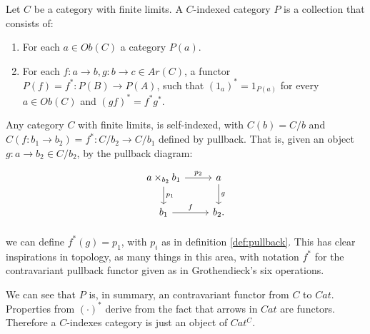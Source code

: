 \begin{definition}
  Let $C$ be a category with finite limits. A $C$-indexed category $P$ is a collection that  consists of:
  \begin{enumerate}
  \item For each $a\in Ob(C)$  a category $P(a)$.
  \item For each $f:a\to b, g:b\to c\in Ar(C)$, a functor $P(f) = f^*:P(B) \to P(A)$, such that $(1_a)^* = 1_{P(a)}$ for every  $a \in Ob(C)$ and $(gf)^*= f^*g^*$.
  \end{enumerate}
\end{definition}
\begin{remark}
  Any category $C$ with finite limits, is self-indexed, with $C(b)=C/b$ and $C(f:b_1\to b_2)=f^*: C/b_2 \to C/b_1$ defined by pullback. That is, given an object $g:a\to b_2 \in C/b_2$, by the pullback diagram:
  \[
    \begin{tikzpicture}
      \node {\begin{tikzcd}
          a \times_{b_2} b_1 \ar[r,"p_2"]\ar[d,"p_1"] & a\ar[d,"g"]\\
          b_1\ar[r,"f"] & b_2.
        \end{tikzcd}};
    \end{tikzpicture}
  \]

  we can define $f^*(g) = p_1$, with $p_i$ as in definition \ref{def:pullback}. This has clear inspirations in topology, as many things in this area, with notation $f^*$ for the contravariant pullback functor given as in Grothendieck's six operations\cite{nlab:six_operations}.\\
\end{remark}

We can see that $P$ is, in summary, an contravariant functor from $C$ to $Cat$. Properties from $(\cdot)^*$ derive from the fact that arrows in $Cat$ are functors. Therefore a $C$-indexes category is just an object of $Cat^C$.\\

